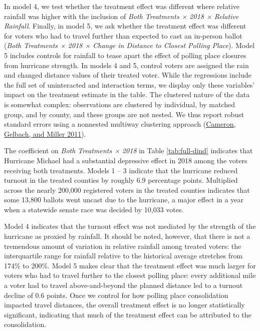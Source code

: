 \documentclass[
  12pt,
]{article}
\begin{document}
In model 4, we test whether the treatment effect was different where relative rainfall was higher with the inclusion of \emph{Both Treatments × 2018 × Relative Rainfall}. Finally, in model 5, we ask whether the treatment effect was different for voters who had to travel further than expected to cast an in-person ballot (\emph{Both Treatments × 2018 × Change in Distance to Closest Polling Place}). Model 5 includes controls for rainfall to tease apart the effect of polling place closures from hurricane strength. In models 4 and 5, control voters are assigned the rain and changed distance values of their treated voter. While the regressions include the full set of uninteracted and interaction terms, we display only these variables' impact on the treatment estimate in the table. The clustered nature of the data is somewhat complex: observations are clustered by individual, by matched group, and by county, and these groups are not nested. We thus report robust standard errors using a nonnested multiway clustering approach (\protect\hyperlink{ref-Cameron2011}{Cameron, Gelbach, and Miller 2011}).

The coefficient on \emph{Both Treatments × 2018} in Table \ref{tab:full-dind} indicates that Hurricane Michael had a substantial depressive effect in 2018 among the voters receiving both treatments. Models 1 -- 3 indicate that the hurricane reduced turnout in the treated counties by roughly 6.9 percentage points. Multiplied across the nearly 200,000 registered voters in the treated counties indicates that some 13,800 ballots went uncast due to the hurricane, a major effect in a year when a statewide senate race was decided by 10,033 votes.

Model 4 indicates that the turnout effect was not mediated by the strength of the hurricane as proxied by rainfall. It should be noted, however, that there is not a tremendous amount of variation in relative rainfall among treated voters: the interquartile range for rainfall relative to the historical average stretches from 174\% to 200\%. Model 5 makes clear that the treatment effect was much larger for voters who had to travel further to the closest polling place: every additional mile a voter had to travel above-and-beyond the planned distance led to a turnout decline of 0.6 points. Once we control for how polling place consolidation impacted travel distances, the overall treatment effect is no longer statistically significant, indicating that much of the treatment effect can be attributed to the consolidation.
\end{document}
